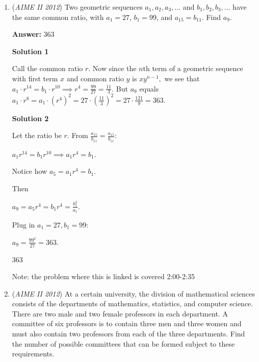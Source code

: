 \begin{enumerate}
 So values of $n$ that belong to ${1, 6, ..., 166}$ work. Clearly, that is 34 integer values of $n$. Therefore, the answer is $\boxed{034}$.

 


	\item (\textit{AIME II 2012}) Two geometric sequences $a_1, a_2, a_3, \ldots$ and $b_1, b_2, b_3, \ldots$ have the same common ratio, with $a_1 = 27$, $b_1=99$, and $a_{15}=b_{11}$. Find $a_9$.


 
 \textbf{Answer: }363



\textbf{Solution 1}

Call the common ratio $r.$ Now since the $n$th term of a geometric sequence with first term $x$ and common ratio $y$ is $xy^{n-1},$ we see that $a_1 \cdot r^{14} = b_1 \cdot r^{10} \implies r^4 = \frac{99}{27} = \frac{11}{3}.$ But $a_9$ equals $a_1 \cdot r^8 = a_1 \cdot (r^4)^2=27\cdot {\left(\frac{11}{3}\right)}^2=27\cdot \frac{121} 9=\boxed{363}$.

 



\textbf{Solution 2}

Let the ratio be \( r \). From \( \frac{a_{15}}{b_{11}} = \frac{a_{15}}{b_{11}} \):

 \( a_1 r^{14} = b_1 r^{10} \implies a_1 r^4 = b_1 \).

 Notice how \( a_5 = a_1 r^4 = b_1 \).

 Then

 \( a_9 = a_5 r^4 = b_1 r^4 = \frac{b_1^2}{a_1} \).

 Plug in \( a_1 = 27, b_1 = 99 \):

 \( a_9 = \frac{99^2}{27} = 363 \).

 $\boxed{363}$

 Note: the problem where this is linked is covered 2:00-2:35

 


	\item (\textit{AIME II 2012}) At a certain university, the division of mathematical sciences consists of the departments of mathematics, statistics, and computer science. There are two male and two female professors in each department. A committee of six professors is to contain three men and three women and must also contain two professors from each of the three departments. Find the number of possible committees that can be formed subject to these requirements.



\end{enumerate}
